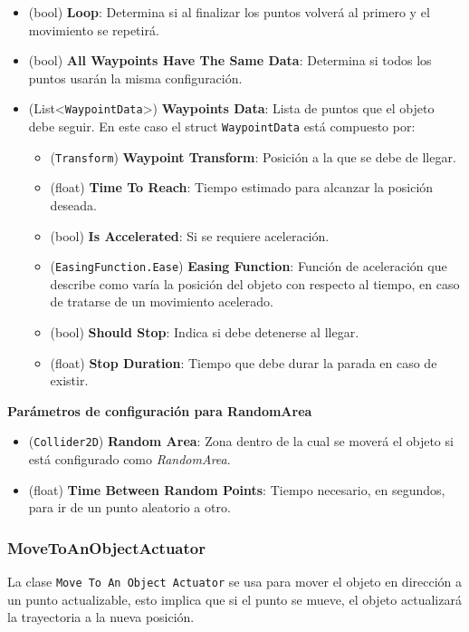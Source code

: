 \begin{itemize} 	
	\item (bool) \textbf{Loop}: Determina si al finalizar los puntos volverá al primero y el movimiento se repetirá.
	\item (bool) \textbf{All Waypoints Have The Same Data}: Determina si todos los puntos usarán la misma configuración.
	\item (List<\texttt{WaypointData}>) \textbf{Waypoints Data}: Lista de puntos que el objeto debe seguir. En este caso el struct \texttt{WaypointData} está compuesto por:
	\begin{itemize} 	
		\item (\texttt{Transform}) \textbf{Waypoint Transform}: Posición a la que se debe de llegar.
		\item (float) \textbf{Time To Reach}: Tiempo estimado para alcanzar la posición deseada.
		\item (bool) \textbf{Is Accelerated}: Si se requiere aceleración.
		\item (\texttt{EasingFunction.Ease}) \textbf{Easing Function}: Función de aceleración que describe como varía la posición del objeto con respecto al tiempo, en caso de tratarse de un movimiento acelerado.
		\item (bool) \textbf{Should Stop}: Indica si debe detenerse al llegar.
		\item (float) \textbf{Stop Duration}: Tiempo que debe durar la parada en caso de existir.
	\end{itemize}
\end{itemize}

\textbf{Parámetros de configuración para RandomArea}
\begin{itemize} 	
	\item (\texttt{Collider2D}) \textbf{Random Area}: Zona dentro de la cual se moverá el objeto si está configurado como \textit{RandomArea}. 
	\item (float) \textbf{Time Between Random Points}: Tiempo necesario, en segundos, para ir de un punto aleatorio a otro.
\end{itemize}


\subsubsection{MoveToAnObjectActuator}
La clase \texttt{Move To An Object Actuator} se usa para mover el objeto en dirección a un punto actualizable, esto implica que si el punto se mueve, el objeto actualizará la trayectoria a la nueva posición.\\

